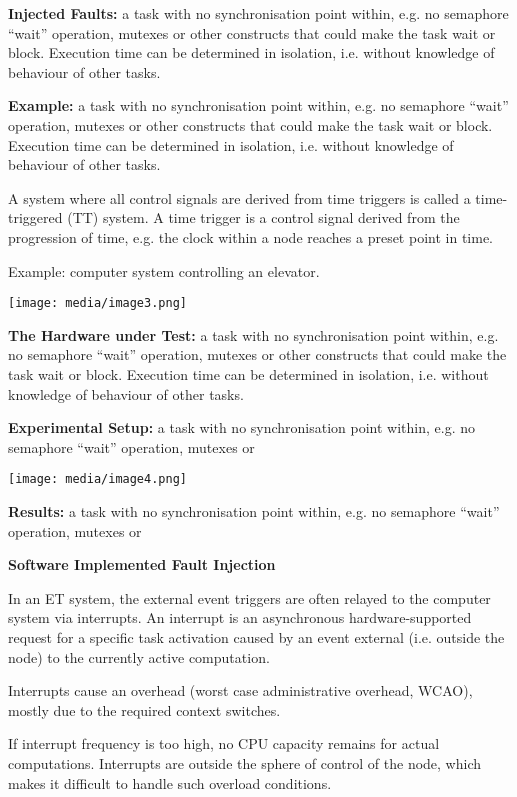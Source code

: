 \textbf{Injected Faults:} a task with no synchronisation point within,
e.g. no semaphore ``wait'' operation, mutexes or other constructs that
could make the task wait or block. Execution time can be determined in
isolation, i.e. without knowledge of behaviour of other tasks.

\textbf{Example:} a task with no synchronisation point within, e.g. no
semaphore ``wait'' operation, mutexes or other constructs that could
make the task wait or block. Execution time can be determined in
isolation, i.e. without knowledge of behaviour of other tasks.

A system where all control signals are derived from time triggers is
called a time-triggered (TT) system. A time trigger is a control signal
derived from the progression of time, e.g. the clock within a node
reaches a preset point in time.

Example: computer system controlling an elevator.

\texttt{[image: media/image3.png]}

\textbf{The Hardware under Test:} a task with no synchronisation point
within, e.g. no semaphore ``wait'' operation, mutexes or other
constructs that could make the task wait or block. Execution time can be
determined in isolation, i.e. without knowledge of behaviour of other
tasks.

\textbf{Experimental Setup:} a task with no synchronisation point
within, e.g. no semaphore ``wait'' operation, mutexes or

\texttt{[image: media/image4.png]}

\textbf{Results:} a task with no synchronisation point within, e.g. no
semaphore ``wait'' operation, mutexes or

\textbf{Software Implemented Fault Injection}

In an ET system, the external event triggers are often relayed to the
computer system via interrupts. An interrupt is an asynchronous
hardware-supported request for a specific task activation caused by an
event external (i.e. outside the node) to the currently active
computation.

Interrupts cause an overhead (worst case administrative overhead, WCAO),
mostly due to the required context switches.

If interrupt frequency is too high, no CPU capacity remains for actual
computations. Interrupts are outside the sphere of control of the node,
which makes it difficult to handle such overload conditions.

